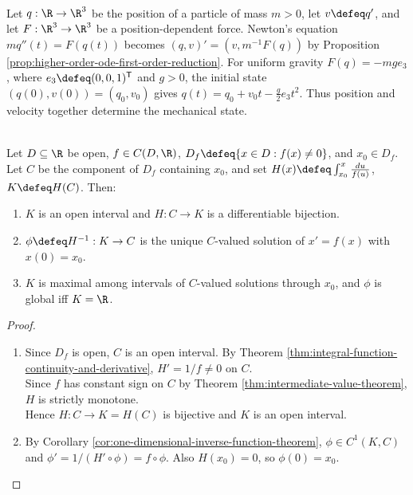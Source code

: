 \begin{example} \label{ex:newtonian-motion-first-order-state} \\
Let $q:\R\to\R^3$ be the position of a particle of mass $m>0$, let $v\defeq q'$, and let $F:\R^3\to\R^3$ be a position-dependent force. Newton's equation $mq''(t)=F(q(t))$ becomes $(q,v)'=(v,m^{-1}F(q))$ by Proposition \ref{prop:higher-order-ode-first-order-reduction}. For uniform gravity $F(q)=-mg e_3$, where $e_3\defeq(0,0,1)^\mathsf{T}$ and $g>0$, the initial state $(q(0),v(0))=(q_0,v_0)$ gives $q(t)=q_0+v_0t-\frac{g}{2}e_3t^2$. Thus position and velocity together determine the mechanical state.
\end{example}

\begin{proposition} \label{prop:scalar-autonomous-separation-maximal-branch} \\
Let $D\subseteq\R$ be open, $f\in C(D,\R)$, $D_f\defeq\{x\in D:f(x)\neq0\}$, and $x_0\in D_f$.\\
Let $C$ be the component of $D_f$ containing $x_0$, and set $H(x)\defeq\int_{x_0}^{x}\frac{du}{f(u)}$, $K\defeq H(C)$. Then:
\begin{enumerate}[label=(\roman*)]
\setlength{\itemsep}{0pt}
\item $K$ is an open interval and $H:C\to K$ is a differentiable bijection.
\item $\phi\defeq H^{-1}:K\to C$ is the unique $C$-valued solution of $x'=f(x)$ with $x(0)=x_0$.
\item $K$ is maximal among intervals of $C$-valued solutions through $x_0$, and $\phi$ is global iff $K=\R$.
\end{enumerate}
\begin{proof}
\begin{enumerate}[label=(\roman*)]
\setlength{\itemsep}{0pt}
\item Since $D_f$ is open, $C$ is an open interval. By Theorem \ref{thm:integral-function-continuity-and-derivative}, $H'=1/f\neq0$ on $C$.\\
Since $f$ has constant sign on $C$ by Theorem \ref{thm:intermediate-value-theorem}, $H$ is strictly monotone.\\
Hence $H:C\to K=H(C)$ is bijective and $K$ is an open interval.
\item By Corollary \ref{cor:one-dimensional-inverse-function-theorem}, $\phi\in C^1(K,C)$ and $\phi'=1/(H'\circ\phi)=f\circ\phi$. Also $H(x_0)=0$, so $\phi(0)=x_0$.\\

\end{enumerate}
\end{proof}
\end{proposition}
